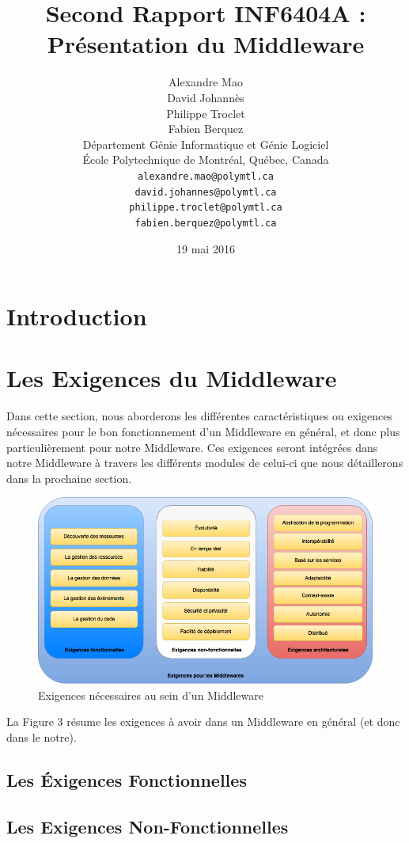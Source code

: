 \documentclass{article}
\title{Second Rapport INF6404A : Présentation du Middleware}
\author{
	Alexandre Mao\\
	David Johannès \\
	Philippe Troclet \\
	Fabien Berquez \\
	D\'{e}partement G\'{e}nie Informatique et G\'{e}nie Logiciel \\
	\'{E}cole Polytechnique de Montr\'{e}al, Qu\'{e}bec, Canada \\
	\texttt{alexandre.mao@polymtl.ca}\\
	\texttt{david.johannes@polymtl.ca}\\
	\texttt{philippe.troclet@polymtl.ca}   \\
	\texttt{fabien.berquez@polymtl.ca}   \\
}
\date{19 mai 2016}
\begin{document}
\maketitle

\section{Introduction}


\section{Les Exigences du Middleware}
Dans cette section, nous aborderons les différentes caractéristiques ou exigences nécessaires pour le bon fonctionnement d'un Middleware en général, et donc plus particulièrement pour notre Middleware. Ces exigences seront intégrées dans notre Middleware à travers les différents modules de celui-ci que nous détaillerons dans la prochaine section.

\begin{figure}[h!]
	\hspace*{-3cm}
	\centering
	\includegraphics[width=1.5\textwidth]{Figure3.png}
	\caption{Exigences nécessaires au sein d'un Middleware}
	\label{fig:balance}
\end{figure}

La Figure 3 résume les exigences à avoir dans un Middleware en général (et donc dans le notre).

\subsection{Les Éxigences Fonctionnelles}

\subsection{Les Exigences Non-Fonctionnelles}

\end{document}
